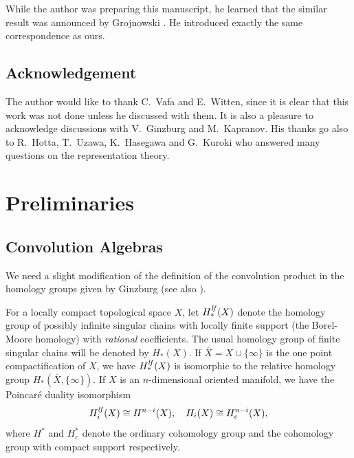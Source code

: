 \documentclass[12pt]{amsart}
\theoremstyle{definition}
\theoremstyle{remark}
\numberwithin{equation}{section}
\newcommand{\Hlf}{H^{\it lf}} %
\begin{document}
While the author was preparing this manuscript, he learned that the
similar result was announced by Grojnowski \cite{Gr}. He introduced
exactly the same correspondence as ours.

\subsection*{Acknowledgement}
The author would like to thank C.~Vafa and E.~Witten, since
it is clear that this work was not done unless he discussed
with them.
It is also a pleasure to acknowledge discussions with V.~Ginzburg and
M.~Kapranov.
His thanks go also to R.~Hotta, T.~Uzawa, K.~Hasegawa and G.~Kuroki
who answered many questions on the representation theory.
%
\section{Preliminaries}
\label{sec:pre}
%
\subsection{Convolution Algebras}
\label{subsec:conv}
%
We need a slight modification of the definition of the convolution
product in the homology groups given by Ginzburg \cite{Gi} (see also
\cite{Gi-book,Na-quiver}).

For a locally compact topological space $X$, let $\Hlf_*(X)$
denote the homology group of possibly infinite singular chains with locally
finite support (the Borel-Moore homology) with {\it rational\/}
coefficients.
The usual homology group of finite singular chains will be denoted by
$H_*(X)$.
If $\overline X = X\cup \{\infty\}$ is the one point compactification
of $X$, we have $\Hlf_*(X)$ is isomorphic to the relative homology
group $H_*(\overline X, \{\infty\})$.
If $X$ is an $n$-dimensional oriented manifold,
we have the Poincar\'e duality isomorphism
\begin{equation}
        \Hlf_i(X) \cong H^{n-i}(X),\quad
        H_i(X) \cong H^{n-i}_c(X),
\label{eq:PD}\end{equation}
where $H^*$ and $H^*_c$ denote the ordinary cohomology group and the
cohomology group with compact support respectively.
\end{document}

